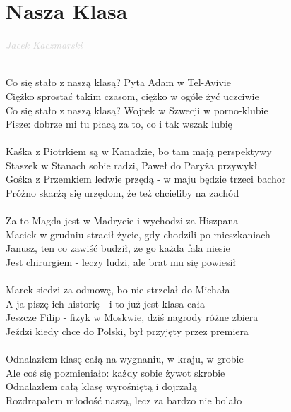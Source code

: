 \documentclass[a5paper, 10pt]{book}
\begin{document}
\newpage
\section{Nasza Klasa}\textcolor{lightgray}{\textit{Jacek Kaczmarski}}\\~\\
\begin{minipage}[t]{0.85\textwidth}
  Co się stało z naszą klasą? Pyta Adam w Tel-Avivie\\
  Ciężko sprostać takim czasom, ciężko w ogóle żyć uczciwie\\
  Co się stało z naszą klasą? Wojtek w Szwecji w porno-klubie\\
  Pisze: dobrze mi tu płacą za to, co i tak wszak lubię \\
  \\
  Kaśka z Piotrkiem są w Kanadzie, bo tam mają perspektywy\\
  Staszek w Stanach sobie radzi, Paweł do Paryża przywykł\\
  Gośka z Przemkiem ledwie przędą - w maju będzie trzeci bachor\\
  Próżno skarżą się urzędom, że też chcieliby na zachód \\
  \\
  Za to Magda jest w Madrycie i wychodzi za Hiszpana\\
  Maciek w grudniu stracił życie, gdy chodzili po mieszkaniach\\
  Janusz, ten co zawiść budził, że go każda fala niesie\\
  Jest chirurgiem - leczy ludzi, ale brat mu się powiesił \\
  \\
  Marek siedzi za odmowę, bo nie strzelał do Michała\\
  A ja piszę ich historię - i to już jest klasa cała\\
  Jeszcze Filip - fizyk w Moskwie, dziś nagrody różne zbiera\\
  Jeździ kiedy chce do Polski, był przyjęty przez premiera \\
  \\
  Odnalazłem klasę całą na wygnaniu, w kraju, w grobie\\
  Ale coś się pozmieniało: każdy sobie żywot skrobie\\
  Odnalazłem całą klasę wyrośniętą i dojrzałą\\
  Rozdrapałem młodość naszą, lecz za bardzo nie bolało \\
  \\

\end{minipage}
\end{document}
